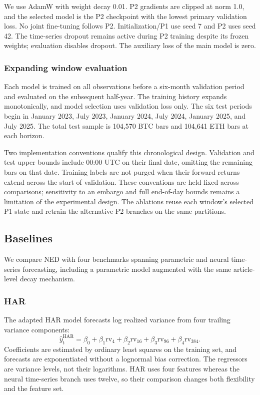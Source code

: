 We use AdamW \citep{adamw} with weight decay 0.01. P2 gradients are
clipped at norm 1.0, and the selected model is the P2 checkpoint with
the lowest primary validation loss. No joint fine-tuning follows P2.
Initialization/P1 use seed 7 and P2 uses seed 42. The time-series dropout
remains active during P2 training despite its frozen weights; evaluation
disables dropout. The auxiliary loss of the main model is zero.

\subsubsection{Expanding window evaluation}
Each model is trained on all observations before a six-month validation
period and evaluated on the subsequent half-year. The training history
expands monotonically, and model selection uses validation loss only.
The six test periods begin in January 2023, July 2023, January 2024,
July 2024, January 2025, and July 2025. The total test sample is 104,570
BTC bars and 104,641 ETH bars at each horizon.

Two implementation conventions qualify this chronological design.
Validation and test upper bounds include 00:00 UTC on their final date,
omitting the remaining bars on that date. Training labels are not purged
when their forward returns extend across the start of validation.
These conventions are held fixed across comparisons; sensitivity to
an embargo and full end-of-day bounds remains a limitation of the
experimental design. The ablations reuse each window's selected P1
state and retrain the alternative P2 branches on the same partitions.

\subsection{Baselines}\label{sec:baselines}
We compare NED with four benchmarks spanning parametric and neural
time-series forecasting, including a parametric model augmented with
the same article-level decay mechanism.

\subsubsection{HAR}
The adapted HAR model \citep{Corsi_2008} forecasts log realized variance
from four trailing variance components:
\begin{equation}
 \hat y_t^{\mathrm{HAR}}=\beta_0+\beta_1\mathrm{rv}_4+
 \beta_2\mathrm{rv}_{16}+\beta_3\mathrm{rv}_{96}+\beta_4\mathrm{rv}_{384}.
 \label{eq:har}
\end{equation}
Coefficients are estimated by ordinary least squares on the training
set, and forecasts are exponentiated without a lognormal bias
correction. The regressors are variance levels, not their logarithms.
HAR uses four features whereas the neural time-series branch uses
twelve, so their comparison changes both flexibility and the feature set.

